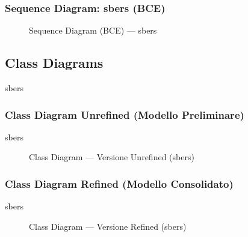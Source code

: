 \subsubsection{Sequence Diagram: sbers (BCE)}
\begin{figure}[H]
    \centering
    \caption{Sequence Diagram (BCE) --- sbers}
    \label{fig:seq_02}
\end{figure}

\newpage
\subsection{Class Diagrams}

sbers

\subsubsection{Class Diagram Unrefined (Modello Preliminare)}
sbers

\begin{figure}[H]
    \centering
    \caption{Class Diagram --- Versione Unrefined (sbers)}
    \label{fig:class_unrefined}
\end{figure}

\subsubsection{Class Diagram Refined (Modello Consolidato)}
sbers

\begin{figure}[H]
    \centering
    \caption{Class Diagram --- Versione Refined (sbers)}
    \label{fig:class_refined}
\end{figure}
